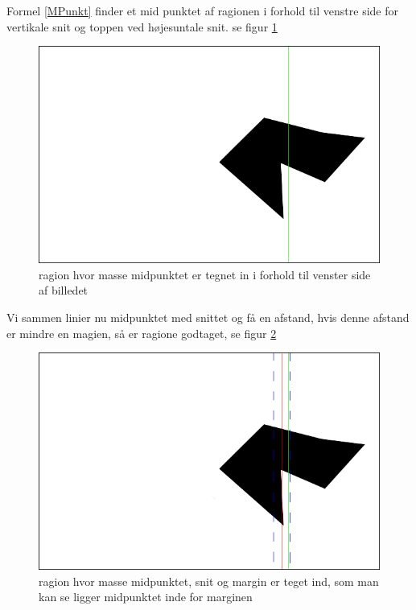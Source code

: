 {Formel \ref{MPunkt} finder et mid punktet af ragionen i forhold til
venstre side for vertikale snit og toppen ved højesuntale snit. se figur
\ref{midpunkt}

\begin{figure}[h]
	\begin{center}
		\includegraphics[scale=0.5,angle=0]{afsnit/vores_implementation/billeder/udvidet_loesning/centerOfmass.png}
	\end{center}
	\caption[]{ragion hvor masse midpunktet er tegnet in i forhold til venster side af billedet}
	\label{midpunkt}
\end{figure}

Vi sammen linier nu midpunktet med snittet og få en afstand, hvis denne
afstand er mindre en magien, så er ragione godtaget, se figur
\ref{cOMCutMargin}

\begin{figure}[h]
	\begin{center}
		\includegraphics[scale=0.5,angle=0]{afsnit/vores_implementation/billeder/udvidet_loesning/cOMCutMargin.png}
	\end{center}
	\caption[]{ragion hvor masse midpunktet, snit og margin er teget ind, som man kan se ligger midpunktet inde for marginen}
	\label{cOMCutMargin}
\end{figure}

}
